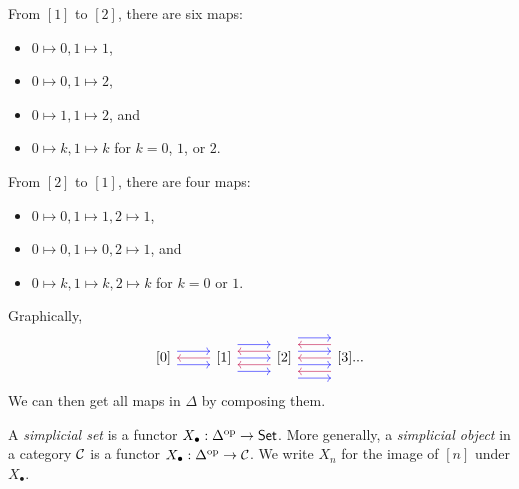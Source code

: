 \begin{ex}
	From $[1]$ to $[2]$, there are six maps:
	\begin{itemize}
		\item $0 \mapsto 0, 1 \mapsto 1$,
		\item $0 \mapsto 0, 1 \mapsto 2$,
		\item $0 \mapsto 1, 1 \mapsto 2$, and
		\item $0 \mapsto k, 1 \mapsto k$ for $k = 0$, $1$, or $2$.
	\end{itemize}
\end{ex}

\begin{ex}
	From $[2]$ to $[1]$, there are four maps:
	\begin{itemize}
		\item $0 \mapsto 0, 1 \mapsto 1, 2 \mapsto 1$,
		\item $0 \mapsto 0, 1 \mapsto 0, 2 \mapsto 1$, and
		\item $0 \mapsto k, 1 \mapsto k, 2 \mapsto k$ for $k = 0$ or $1$.
	\end{itemize}
\end{ex}
Graphically,
\begin{equation*}
	\begin{tikzcd}
	{[}0{]} \arrow[r, shift left=2, blue] \arrow[r, shift right=2, blue]
	&{[}1{]} \arrow[l, purple] \arrow[r, shift left=4, blue] \arrow[r, shift right=4, blue] \arrow[r, blue]
	&{[}2{]}  \arrow[l, shift left = 2, purple]  \arrow[l, purple, shift right=2] \arrow[r, shift left=2, blue] \arrow[r, shift right=2, blue] \arrow[r, shift left=6, blue] \arrow[r, shift right=6, blue]
	&{[}3{]}... \arrow[l, shift left=4, purple] \arrow[l, shift right=4, purple] \arrow[l,purple]
	\end{tikzcd}
\end{equation*}
We can then get all maps in $\Delta$ by composing them.
\begin{dfn}
	A \emph{simplicial set} is a functor $X_\bullet: \Delta^{\mathrm{op}} \to \mathsf{Set}$.
	More generally, a \emph{simplicial object} in a category $\mathcal{C}$ is a functor $X_\bullet: \Delta^{\mathrm{op}} \to \mathcal{C}$.
	We write $X_n$ for the image of $[n]$ under $X_\bullet$.
\end{dfn}

